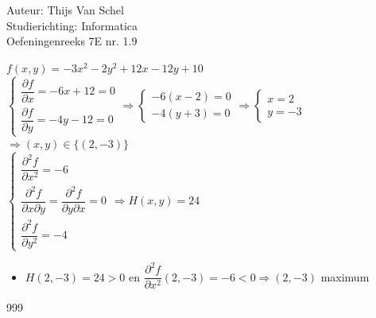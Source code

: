 \documentclass[a4paper]{article}
\begin{document}
  
\noindent \large Auteur: Thijs Van Schel \\
\noindent \large Studierichting: Informatica\\
\noindent \large Oefeningenreeks 7E nr. 1.9\\

\medskip

\normalsize

$f(x,y) = -3x^2 - 2y^2 + 12x - 12y + 10$ \\

$
\left\{ 
\begin{array}{l} 
\dfrac{\partial f}{\partial x} = -6x + 12 = 0 \\ 
\dfrac{\partial f}{\partial y} = -4y - 12 = 0 
\end{array} 
\right.
\Rightarrow
\left\{ 
\begin{array}{l} 
-6(x - 2) = 0 \\ 
-4(y + 3) = 0 
\end{array} 
\right.
\Rightarrow
\left\{ 
\begin{array}{l} 
x = 2 \\ 
y = -3 
\end{array} 
\right.
$ \\

$\Rightarrow (x,y) \in \{(2, -3)\}$ \\

$
\left\{ 
\begin{array}{l} 
\dfrac{\partial^2 f}{\partial x^2} = -6 \\ 
\dfrac{\partial^2 f}{\partial x \partial y} = \dfrac{\partial^2 f}{\partial y \partial x} = 0 \\
\dfrac{\partial^2 f}{\partial y^2} = -4
\end{array} 
\right.
\Rightarrow H(x,y) = 24
$ \\

\begin{itemize}
    \item $H(2, -3) = 24 > 0 \text{ en } \dfrac{\partial^2 f}{\partial x^2}(2, -3) = -6 < 0 \Rightarrow (2, -3)$ maximum
\end{itemize}

\begin{thebibliography}{999}
\end{thebibliography}
\end{document}
